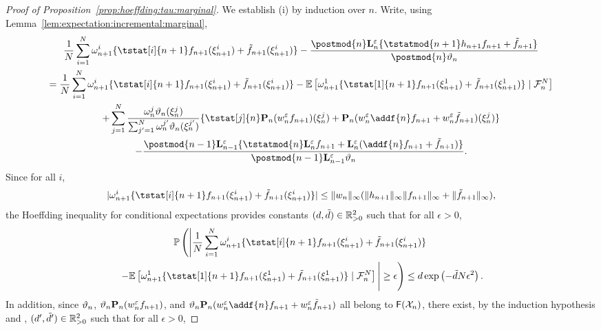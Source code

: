 \begin{proof}[Proof of Proposition~\ref{prop:hoeffding:tau:marginal}]
We establish (i) by induction over $n$. Write, using Lemma~\ref{lem:expectation:incremental:marginal},
\begin{multline} \label{eq:hoeffding:decomp}
\frac{1}{\N} \sum_{i = 1}^\N \ewght{n + 1}{i} \{\tstat[i]{n + 1} f_{n + 1}(\epart{n + 1}{i}) + \ftd{n + 1}(\epart{n + 1}{i})\} - \frac{\postmod{n} \ukmod{n} \{ \tstatmod{n + 1} h_{n + 1} f_{n + 1} + \ftd{n + 1} \}}{\postmod{n} \adjfuncforward{n}}  \\
= \frac{1}{\N} \sum_{i = 1}^\N \ewght{n + 1}{i} \{\tstat[i]{n + 1} f_{n + 1}(\epart{n + 1}{i}) + \ftd{n + 1}(\epart{n + 1}{i})\} - \pE \left[ \ewght{n + 1}{1} \{\tstat[1]{n + 1} f_{n + 1}(\epart{n + 1}{1}) + \ftd{n + 1}(\epart{n + 1}{1})\} \cond \calF{n}{\N} \right] \\
+ \sum_{j = 1}^\N 
\frac{\ewght{n}{j} \adjfuncforward{n}(\epart{n}{j})}{\sum_{j' = 1}^\N \ewght{n}{j'} \adjfuncforward{n}(\epart{n}{j'})} \{ \tstat[j]{n} \prop{n} (\wgtfuncmod{n} f_{n + 1})(\epart{n}{j}) + \prop{n}(\wgtfuncmod{n} \addf{n} f_{n + 1} + \wgtfuncmod{n} \ftd{n + 1})(\epart{n}{j})\} \\
- \frac{\postmod{n - 1} \ukmod{n - 1}\{\tstatmod{n} \ukmod{n} f_{n + 1} + \ukmod{n} (\addf{n} f_{n + 1} + \ftd{n + 1})\}}{\postmod{n - 1} \ukmod{n - 1} \adjfuncforward{n}}. 
\end{multline}
Since for all $i$, 
$$
|\ewght{n + 1}{i} \{\tstat[i]{n + 1} f_{n + 1}(\epart{n + 1}{i}) + \ftd{n + 1}(\epart{n + 1}{i})\}| \leq \| \wgtfunc{n} \|_\infty (\| h_{n + 1} \|_\infty \| f_{n + 1} \|_\infty + \| \ftd{n + 1} \|_\infty), 
$$
the Hoeffding inequality for conditional expectations provides constants $(d, \tilde{d}) \in \mathbb{R}_{> 0}^2$ such that for all $\epsilon > 0$, 
\begin{multline*}
\pP \left( \left| \frac{1}{\N} \sum_{i = 1}^\N \ewght{n + 1}{i} \{\tstat[i]{n + 1} f_{n + 1}(\epart{n + 1}{i}) + \ftd{n + 1}(\epart{n + 1}{i})\} \right. \right. \\
\left. \left.  - \pE \left[ \ewght{n + 1}{1} \{\tstat[1]{n + 1} f_{n + 1}(\epart{n + 1}{1}) + \ftd{n + 1}(\epart{n + 1}{1})\} \cond \calF{n}{\N} \right] \vphantom{\sum_{i = 1}^\N} \right| \geq \epsilon \right) \leq d \exp \left( - \tilde{d} N \epsilon^2 \right).  
\end{multline*}
In addition, since $\vartheta_{n}$, $\vartheta_{n} \mathbf{P}_{n} (w^{\varepsilon}_{n} f_{n + 1})$, and $\adjfuncforward{n} \prop{n}(\wgtfuncmod{n} \addf{n} f_{n + 1} + \wgtfuncmod{n} \ftd{n + 1})$ all belong to $\mathsf{F}(\mathcal{X}_n)$, there exist, by the induction hypothesis and \cite[Lemma~4]{douc:garivier:moulines:olsson:2010}, $(d', \tilde{d}') \in \mathbb{R}_{> 0}^2$ such that for all $\epsilon > 0$, 

\end{proof}
